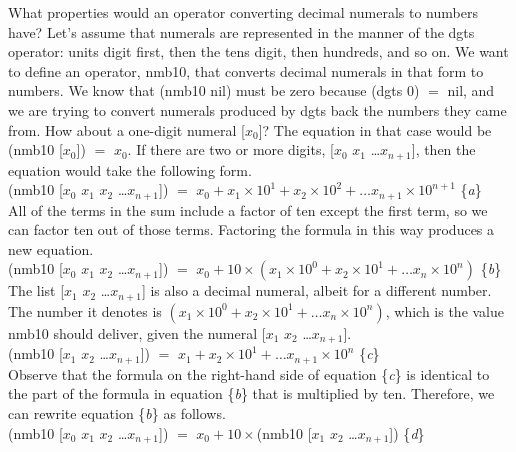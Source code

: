 What properties would an operator
converting decimal numerals to numbers have?
Let's assume that numerals are represented
in the manner of the \textsf{dgts} operator:
units digit first,
then the tens digit, then hundreds, and so on.
We want to define an operator, \textsf{nmb10}, 
that converts decimal numerals in that form to numbers.
We know that \textsf{(nmb10 nil)} must be zero 
because \textsf{(dgts 0)} $=$ \textsf{nil}, 
and we are trying to convert numerals produced by \textsf{dgts}
back the numbers they came from.
How about a one-digit numeral \textsf{[$x_0$]}?
The equation in that case would be \textsf{(nmb10 [$x_0$])} $=$ $x_0$.
If there are two or more digits, 
\textsf{[$x_0$ $x_1$ \dots $x_{n+1}$]},
then the equation would take the following form.\\
\hspace*{1cm}
\textsf{(nmb10 [$x_0$ $x_1$ $x_2$ \dots $x_{n+1}$])} $=$
$x_0 + x_1 \times 10^1 + x_2 \times 10^2 + \dots x_{n+1} \times 10^{n+1}$ \hfill \{\emph{a}\}\\

All of the terms in the sum
include a factor of ten except the first term,
so we can factor ten out of those terms.
Factoring the formula in this way produces a new equation.\\
\hspace*{1cm}
\textsf{(nmb10 [$x_0$ $x_1$ $x_2$ \dots $x_{n+1}$])} $=$
$x_0 + 10 \times (x_1 \times 10^0 + x_2 \times 10^1 + \dots x_n \times 10^n)$ \hfill \{\emph{b}\}\\

The list \textsf{[$x_1$ $x_2$ \dots $x_{n+1}$]} is also a decimal numeral,
albeit for a different number.
The number it denotes is
$(x_1 \times 10^0 + x_2 \times 10^1 + \dots x_n \times 10^n)$,
which is the value \textsf{nmb10} should deliver, given the numeral \textsf{[$x_1$ $x_2$ \dots $x_{n+1}$]}.\\
\hspace*{1cm}
\textsf{(nmb10 [$x_1$ $x_2$ \dots $x_{n+1}$])} $=$ $x_1 + x_2 \times 10^1 + \dots x_{n+1} \times 10^n$ \hfill \{\emph{c}\}\\

Observe that the formula on the right-hand side of equation \{\emph{c}\}
is identical
to the part of the formula in equation \{\emph{b}\} that is multiplied by ten.
Therefore, we can rewrite equation \{\emph{b}\} as follows.\\
\hspace*{1cm}
\textsf{(nmb10 [$x_0$ $x_1$ $x_2$ \dots $x_{n+1}$])} $=$
$x_0 + 10 \times$\textsf{(nmb10 [$x_1$ $x_2$ \dots $x_{n+1}$])} \hfill \{\emph{d}\}\\

